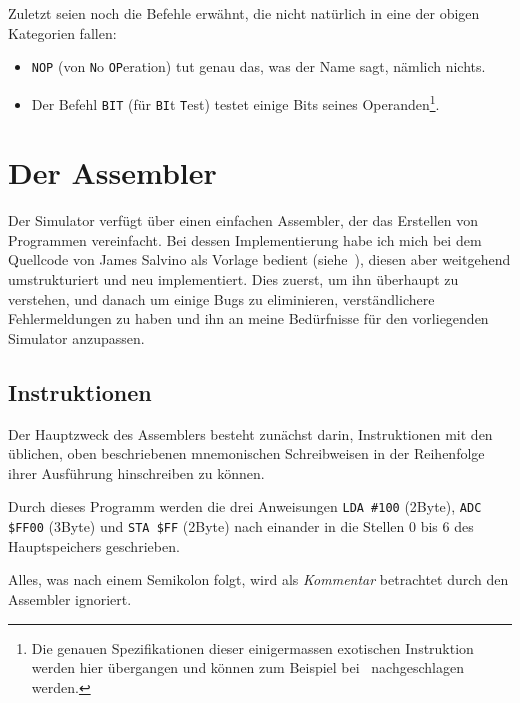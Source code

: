 \documentclass[11pt]{scrartcl}
\newcommand{\byte}{\unit{Byte}}
\begin{document}
Zuletzt seien noch die Befehle erwähnt, die nicht natürlich in eine
der obigen Kategorien fallen:

\begin{itemize}
\item \lstinline!NOP! (von \texttt{N}o  \texttt{OP}eration) tut genau
  das, was der Name sagt, nämlich nichts.
\item Der Befehl \lstinline!BIT! (für \texttt{BI}t \texttt{T}est)
  testet einige Bits seines Operanden\footnote{Die genauen
    Spezifikationen dieser einigermassen exotischen Instruktion werden
    hier übergangen und können zum Beispiel bei~\cite{6502org_instructions}
    nachgeschlagen werden.}.
\end{itemize}


\newpage
\section{Der Assembler}
\label{sec:assembler}

Der Simulator verfügt über einen einfachen Assembler, der das
Erstellen von Programmen vereinfacht. Bei dessen Implementierung habe
ich mich bei dem Quellcode von James Salvino als Vorlage bedient
(siehe~\cite{6502Asm}), diesen aber weitgehend umstrukturiert und neu
implementiert. Dies zuerst, um ihn überhaupt zu verstehen, und danach
um einige Bugs zu eliminieren, verständlichere Fehlermeldungen zu
haben und ihn an meine Bedürfnisse für den vorliegenden Simulator
anzupassen.


\subsection{Instruktionen}
\label{sec:ass_instructions}


Der Hauptzweck des Assemblers besteht zunächst darin, Instruktionen
mit den üblichen, oben beschriebenen mnemonischen Schreibweisen in der
Reihenfolge ihrer Ausführung hinschreiben zu können.

\begin{center}
  
\end{center}

Durch dieses Programm werden die drei Anweisungen \lstinline!LDA #100!
(2\byte), \lstinline!ADC $FF00! (3\byte) und \lstinline!STA $FF!
(2\byte) nach einander in die Stellen 0 bis 6 des Hauptspeichers
geschrieben.

Alles, was nach einem Semikolon folgt, wird als \emph{Kommentar}
betrachtet durch den Assembler ignoriert.
\end{document}
